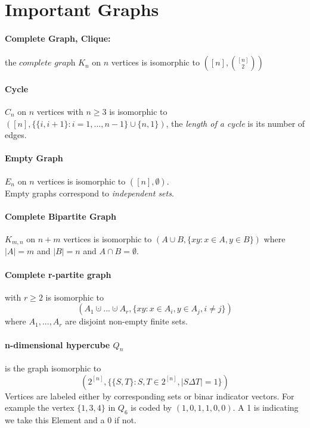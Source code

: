 \section{Important Graphs}

\paragraph{Complete Graph, Clique:} $ $ \\ 
the $ \textit{complete graph } K_n $ on $ n $ vertices is isomorphic to
$ ([n], \binom{[n]}{2}) $ 

\paragraph{Cycle} $ $ \\
$C_n $ on $ n $ vertices with $ n \geq 3 $ is isomorphic to 
$ ([n], \{\{i,i+1\}: i = 1,...,n-1\} \cup \{n,1\}) $, the \textit{length of a cycle} 
is its number of edges.

\paragraph{Empty Graph} $ $ \\
$ E_n $ on $ n $ vertices is isomorphic to $ ([n],\emptyset) $. \\
Empty graphs correspond to \textit{independent sets}.

\paragraph{Complete Bipartite Graph} $ $ \\
$ K_{m,n} $ on $ n+m $ vertices is isomorphic to 
$ (A \cup B, \{xy: x \in A, y \in B \}) $ where $ |A| = m $ and $ |B| = n $ and
$ A \cap B = \emptyset $.

\paragraph{Complete r-partite graph}
with $ r \geq 2 $ is isomorphic to
$$ (A_1 \cupdot...\cupdot A_r, \{xy: x \in A_i, y \in A_j, i \neq j\}) $$ 
where $ A_1,...,A_r $ are disjoint non-empty finite sets.

\paragraph{n-dimensional hypercube $ Q_n $}
is the graph isomorphic to 
$$ (2^{[n]}, \{\{S,T\}: S,T \in 2^{[n]}, |S\Delta T| = 1\}) $$
Vertices are labeled either by corresponding sets or binar indicator vectors.
For example the vertex $ \{1,3,4\} $ in $ Q_6 $ is coded by $ (1,0,1,1,0,0) $.
A 1 is indicating we take this Element and a 0 if not.